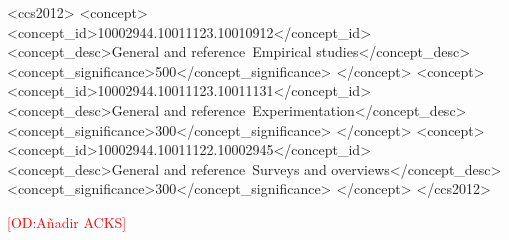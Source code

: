 \documentclass[acmtosem, screen, review]{acmart}
\newcommand{\odnote}[1]{\textcolor{red}{[OD:#1]}}
\begin{document}
\begin{CCSXML}
<ccs2012>
   <concept>
       <concept_id>10002944.10011123.10010912</concept_id>
       <concept_desc>General and reference~Empirical studies</concept_desc>
       <concept_significance>500</concept_significance>
       </concept>
   <concept>
       <concept_id>10002944.10011123.10011131</concept_id>
       <concept_desc>General and reference~Experimentation</concept_desc>
       <concept_significance>300</concept_significance>
       </concept>
   <concept>
       <concept_id>10002944.10011122.10002945</concept_id>
       <concept_desc>General and reference~Surveys and overviews</concept_desc>
       <concept_significance>300</concept_significance>
       </concept>
 </ccs2012>
\end{CCSXML}



\received[revised]{}
\received[accepted]{}

\maketitle


























\begin{acks}
  \odnote{A\~nadir ACKS}
\end{acks}


\clearpage
\onecolumn

\appendix



\end{document}
